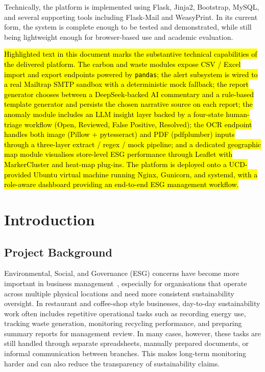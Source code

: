 \documentclass[11pt,a4paper]{article}
\newcommand{\new}[1]{\hl{#1}}
\begin{document}
Technically, the platform is implemented using Flask, Jinja2, Bootstrap, MySQL, and several supporting tools including Flask-Mail and WeasyPrint. In its current form, the system is complete enough to be tested and demonstrated, while still being lightweight enough for browser-based use and academic evaluation.

\new{Highlighted text in this document marks the substantive technical capabilities of the delivered platform. The carbon and waste modules expose CSV / Excel import and export endpoints powered by \texttt{pandas}; the alert subsystem is wired to a real Mailtrap SMTP sandbox with a deterministic mock fallback; the report generator chooses between a DeepSeek-backed AI commentary and a rule-based template generator and persists the chosen narrative source on each report; the anomaly module includes an LLM insight layer backed by a four-state human-triage workflow (Open, Reviewed, False Positive, Resolved); the OCR endpoint handles both image (Pillow + pytesseract) and PDF (pdfplumber) inputs through a three-layer extract / regex / mock pipeline; and a dedicated geographic map module visualises store-level ESG performance through Leaflet with MarkerCluster and heat-map plug-ins. The platform is deployed onto a UCD-provided Ubuntu virtual machine running Nginx, Gunicorn, and systemd, with a role-aware dashboard providing an end-to-end ESG management workflow.}

\section{Introduction}

\subsection{Project Background}
Environmental, Social, and Governance (ESG) concerns have become more important in business management~\cite{eccles2014}, especially for organisations that operate across multiple physical locations and need more consistent sustainability oversight. In restaurant and coffee-shop style businesses, day-to-day sustainability work often includes repetitive operational tasks such as recording energy use, tracking waste generation, monitoring recycling performance, and preparing summary reports for management review. In many cases, however, these tasks are still handled through separate spreadsheets, manually prepared documents, or informal communication between branches. This makes long-term monitoring harder and can also reduce the transparency of sustainability claims.
\end{document}

